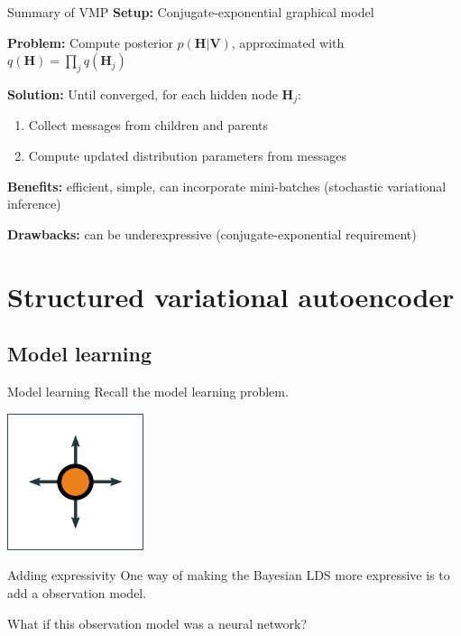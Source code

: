 \documentclass[10pt, compress]{beamer}
\begin{document}
\begin{frame}{Summary of VMP}
  \textbf{Setup:} Conjugate-exponential graphical model

  \pause
  \textbf{Problem:} Compute posterior $p(\mathbf{H} | \mathbf{V})$, approximated with $q(\mathbf{H}) = \prod_j q(\mathbf{H}_j)$

  \pause
  \textbf{Solution:} Until converged, for each hidden node $\mathbf{H}_j$:
  \begin{enumerate}
      \pause
    \item Collect messages from children and parents
      \pause
    \item Compute updated distribution parameters from messages
  \end{enumerate}

  \pause
  \textbf{Benefits:} efficient, simple, can incorporate mini-batches (stochastic variational inference)

  \pause
  \textbf{Drawbacks:} can be underexpressive (conjugate-exponential requirement)
\end{frame}

\section{Structured variational autoencoder}

\subsection{Model learning}

\begin{frame}{Model learning}
  Recall the model learning problem.
  \pause
  \begin{center}
    \includegraphics[width=0.3\textwidth]{img/agent-env-1.png}
  \end{center}

  \pause
  \centering
  
\end{frame}

\begin{frame}{Adding expressivity}
  One way of making the Bayesian LDS more expressive
  is to add a observation model.

  \pause

  \centering
  

  \pause

  What if this observation model was a neural network?
\end{frame}
\end{document}
